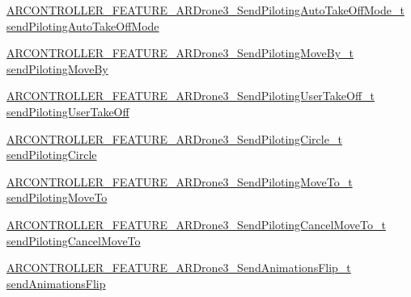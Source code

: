 \begin{DoxyCompactItemize}
\item 
\hyperlink{_a_r_c_o_n_t_r_o_l_l_e_r___feature_8h_a1f8bb6db72d60e504cf2108030dd22f8}{A\+R\+C\+O\+N\+T\+R\+O\+L\+L\+E\+R\+\_\+\+F\+E\+A\+T\+U\+R\+E\+\_\+\+A\+R\+Drone3\+\_\+\+Send\+Piloting\+Auto\+Take\+Off\+Mode\+\_\+t} \hyperlink{struct_a_r_c_o_n_t_r_o_l_l_e_r___f_e_a_t_u_r_e___a_r_drone3__t_ae4e9731980ec242921d8608ab6569a6d}{send\+Piloting\+Auto\+Take\+Off\+Mode}
\item 
\hyperlink{_a_r_c_o_n_t_r_o_l_l_e_r___feature_8h_a80971bb475215c45d0c7f3036fbff8ff}{A\+R\+C\+O\+N\+T\+R\+O\+L\+L\+E\+R\+\_\+\+F\+E\+A\+T\+U\+R\+E\+\_\+\+A\+R\+Drone3\+\_\+\+Send\+Piloting\+Move\+By\+\_\+t} \hyperlink{struct_a_r_c_o_n_t_r_o_l_l_e_r___f_e_a_t_u_r_e___a_r_drone3__t_ab1535efb80988c24b09d01770bdfd11a}{send\+Piloting\+Move\+By}
\item 
\hyperlink{_a_r_c_o_n_t_r_o_l_l_e_r___feature_8h_a2947cd11921f25adb90a2f3004776a7a}{A\+R\+C\+O\+N\+T\+R\+O\+L\+L\+E\+R\+\_\+\+F\+E\+A\+T\+U\+R\+E\+\_\+\+A\+R\+Drone3\+\_\+\+Send\+Piloting\+User\+Take\+Off\+\_\+t} \hyperlink{struct_a_r_c_o_n_t_r_o_l_l_e_r___f_e_a_t_u_r_e___a_r_drone3__t_a84bd93cd93937d3a4c38cb592985d6cd}{send\+Piloting\+User\+Take\+Off}
\item 
\hyperlink{_a_r_c_o_n_t_r_o_l_l_e_r___feature_8h_a49f70a53b45ab8e38ba12c11ce91d7f7}{A\+R\+C\+O\+N\+T\+R\+O\+L\+L\+E\+R\+\_\+\+F\+E\+A\+T\+U\+R\+E\+\_\+\+A\+R\+Drone3\+\_\+\+Send\+Piloting\+Circle\+\_\+t} \hyperlink{struct_a_r_c_o_n_t_r_o_l_l_e_r___f_e_a_t_u_r_e___a_r_drone3__t_a239f05bda72b303fe701ae6c6063c4ac}{send\+Piloting\+Circle}
\item 
\hyperlink{_a_r_c_o_n_t_r_o_l_l_e_r___feature_8h_a0572caffd0b366f7b4f225a79d55801c}{A\+R\+C\+O\+N\+T\+R\+O\+L\+L\+E\+R\+\_\+\+F\+E\+A\+T\+U\+R\+E\+\_\+\+A\+R\+Drone3\+\_\+\+Send\+Piloting\+Move\+To\+\_\+t} \hyperlink{struct_a_r_c_o_n_t_r_o_l_l_e_r___f_e_a_t_u_r_e___a_r_drone3__t_a54ceaf5281d443b962ad0030e25aee56}{send\+Piloting\+Move\+To}
\item 
\hyperlink{_a_r_c_o_n_t_r_o_l_l_e_r___feature_8h_a50edde89a266708b91e0bb1beb226d3d}{A\+R\+C\+O\+N\+T\+R\+O\+L\+L\+E\+R\+\_\+\+F\+E\+A\+T\+U\+R\+E\+\_\+\+A\+R\+Drone3\+\_\+\+Send\+Piloting\+Cancel\+Move\+To\+\_\+t} \hyperlink{struct_a_r_c_o_n_t_r_o_l_l_e_r___f_e_a_t_u_r_e___a_r_drone3__t_a733e33537089e1e025efcfc4600d1929}{send\+Piloting\+Cancel\+Move\+To}
\item 
\hyperlink{_a_r_c_o_n_t_r_o_l_l_e_r___feature_8h_a9c25d85c8d454bf83e0eaf7b3891ce00}{A\+R\+C\+O\+N\+T\+R\+O\+L\+L\+E\+R\+\_\+\+F\+E\+A\+T\+U\+R\+E\+\_\+\+A\+R\+Drone3\+\_\+\+Send\+Animations\+Flip\+\_\+t} \hyperlink{struct_a_r_c_o_n_t_r_o_l_l_e_r___f_e_a_t_u_r_e___a_r_drone3__t_aa542b774f6aa43308184256cf83f5310}{send\+Animations\+Flip}

\end{DoxyCompactItemize}
